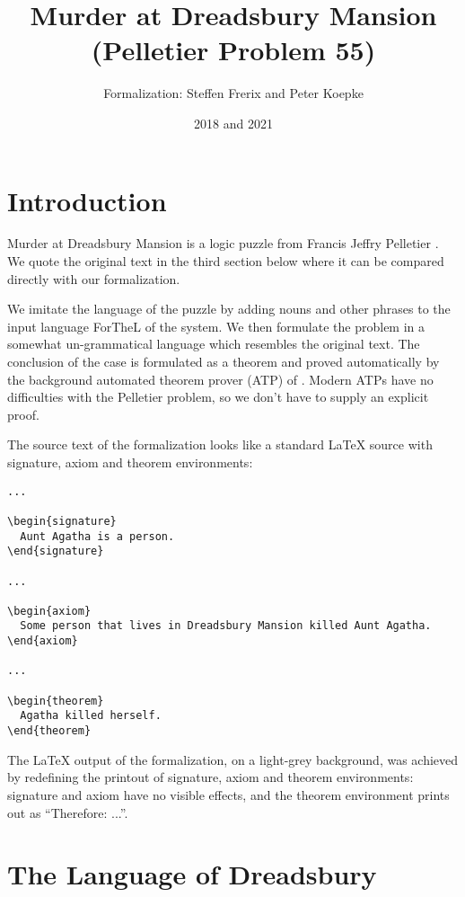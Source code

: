 \documentclass{article}
\title{Murder at Dreadsbury Mansion (Pelletier Problem 55)}
\author{\Naproche Formalization: Steffen Frerix and Peter Koepke}
\date{2018 and 2021}
\begin{document}
\maketitle

\section{Introduction}

Murder at Dreadsbury Mansion is a logic puzzle from Francis Jeffry Pelletier \cite{Pelletier1986}.
We quote the original text in the third section below where it can be compared directly with our formalization.

We imitate the language of the puzzle by adding nouns and other phrases to the input language ForTheL of the \Naproche system.
We then formulate the problem in a somewhat un-grammatical language which resembles the original text.
The conclusion of the case is formulated as a theorem and proved automatically by the background automated theorem prover (ATP) of \Naproche.
Modern ATPs have no difficulties with the Pelletier problem, so we don't
have to supply an explicit proof.

The source text of the formalization looks like a standard \LaTeX{} source
with signature, axiom and theorem environments:

\begin{verbatim}
...

\begin{signature}
  Aunt Agatha is a person.
\end{signature}

...

\begin{axiom}
  Some person that lives in Dreadsbury Mansion killed Aunt Agatha.
\end{axiom}

...

\begin{theorem}
  Agatha killed herself.
\end{theorem}
\end{verbatim}

The \LaTeX{} output of the formalization, on a light-grey background, was
achieved by redefining the printout of signature, axiom and theorem environments: signature and axiom have no visible effects, and the theorem environment prints out as ``Therefore: ...''.


\section{The Language of Dreadsbury}
\end{document}
